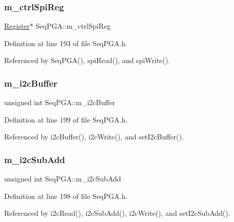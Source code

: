 \subsubsection{\texorpdfstring{m\+\_\+ctrl\+Spi\+Reg}{m\_ctrlSpiReg}}
{\footnotesize\ttfamily \hyperlink{classRegister}{Register}$\ast$ Seq\+P\+G\+A\+::m\+\_\+ctrl\+Spi\+Reg\hspace{0.3cm}{\ttfamily [private]}}



Definition at line 193 of file Seq\+P\+G\+A.\+h.



Referenced by Seq\+P\+G\+A(), spi\+Read(), and spi\+Write().

\mbox{\label{classSeqPGA_afcef519379e9c6ba624ba58a4eac79f1}} 
\subsubsection{\texorpdfstring{m\+\_\+i2c\+Buffer}{m\_i2cBuffer}}
{\footnotesize\ttfamily unsigned int Seq\+P\+G\+A\+::m\+\_\+i2c\+Buffer\hspace{0.3cm}{\ttfamily [private]}}



Definition at line 199 of file Seq\+P\+G\+A.\+h.



Referenced by i2c\+Buffer(), i2c\+Write(), and set\+I2c\+Buffer().

\mbox{\label{classSeqPGA_a82bda98edb9681aff47733e83ac8bc4f}} 
\subsubsection{\texorpdfstring{m\+\_\+i2c\+Sub\+Add}{m\_i2cSubAdd}}
{\footnotesize\ttfamily unsigned int Seq\+P\+G\+A\+::m\+\_\+i2c\+Sub\+Add\hspace{0.3cm}{\ttfamily [private]}}



Definition at line 198 of file Seq\+P\+G\+A.\+h.



Referenced by i2c\+Read(), i2c\+Sub\+Add(), i2c\+Write(), and set\+I2c\+Sub\+Add().

